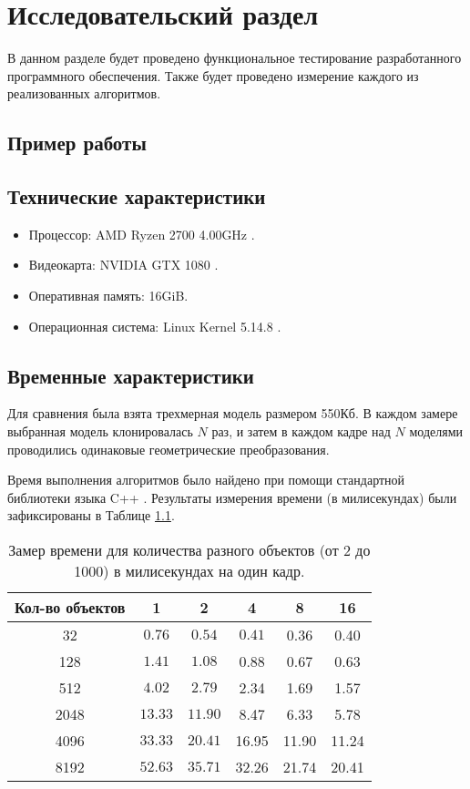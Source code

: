 \chapter{Исследовательский раздел}
\label{cha:research}

В данном разделе будет проведено функциональное тестирование разработанного программного обеспечения. Также будет проведено измерение каждого из реализованных алгоритмов.

\section{Пример работы}

\section{Технические характеристики}
\begin{itemize}
    \item Процессор: AMD Ryzen 2700 4.00GHz \cite{ryzen}.
    \item Видеокарта: NVIDIA GTX 1080 \cite{gtx1080}.
    \item Оперативная память: 16GiB.
    \item Операционная система: Linux Kernel 5.14.8 \cite{kernel}.
\end{itemize}



\section{Временные характеристики}

Для сравнения была взята трехмерная модель размером 550Кб. В каждом замере выбранная модель клонировалась $N$ раз, и затем в каждом кадре над $N$ моделями проводились одинаковые геометрические преобразования.

Время выполнения алгоритмов было найдено при помощи  стандартной библиотеки языка C++ \cite{iso_2017}. 
Результаты измерения времени (в милисекундах) были зафиксированы в Таблице \ref{tab:benchmark}.

\begin{table}[ht]
  \caption{Замер времени для количества разного объектов (от 2 до 1000) в милисекундах на один кадр. }
  \begin{tabular}{|c|c|c|c|c|c|}
  \hline
  Кол-во объектов & 1 & 2  & 4 & 8 & 16\\
  \hline
  32  &  $0.76$   &  $0.54$   & $0.41$ & 0.36 & 0.40          \\
    \hline
  128  & $1.41$   & $1.08$    & 0.88  &  0.67 & 0.63    \\
    \hline
  512  & $4.02$   & $2.79$    & 2.34 & 1.69 & 1.57        \\
    \hline
  2048  & $13.33$  & $11.90$   & 8.47  & 6.33 & 5.78\\
    \hline
  4096 &  $33.33$ & $20.41$ & 16.95 & 11.90 & 11.24\\
    \hline
  8192  &  $52.63$ & $35.71$ & 32.26 & 21.74 & 20.41\\
    \hline
  \end{tabular}
  \label{tab:benchmark}
\end{table}

